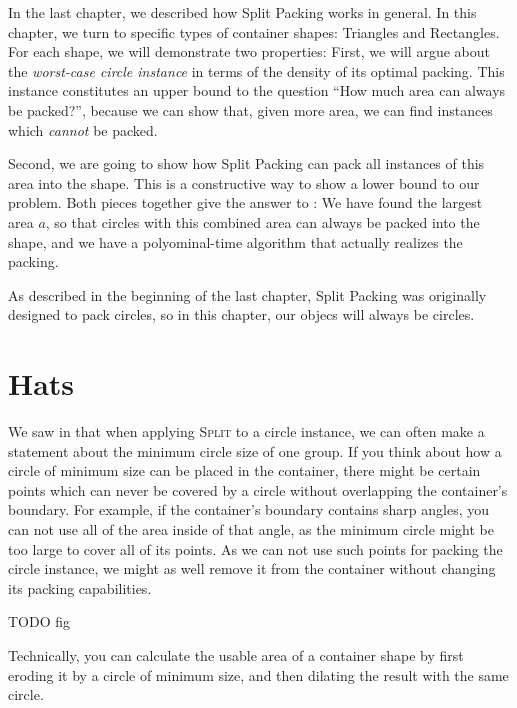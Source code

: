\documentclass[a4paper,style=print,oneside,bibliography=totoc,nexus,lnum,extramargin]{tubsbook}
\begin{document}
In the last chapter, we described how Split Packing works in general. In this chapter, we turn to specific types of container shapes: Triangles and Rectangles. For each shape, we will demonstrate two properties: First, we will argue about the \emph{worst-case circle instance} in terms of the density of its optimal packing. This instance constitutes an upper bound to the question “How much area can always be packed?”, because we can show that, given more area, we can find instances which \emph{cannot} be packed.

Second, we are going to show how Split Packing can pack all instances of this area into the shape. This is a constructive way to show a lower bound to our problem. Both pieces together give the answer to : We have found the largest area $a$, so that circles with this combined area can always be packed into the shape, and we have a polyominal-time algorithm that actually realizes the packing.

As described in the beginning of the last chapter, Split Packing was originally designed to pack circles, so in this chapter, our objecs will always be circles.


\section{Hats}

We saw in  that when applying \textsc{Split} to a circle instance, we can often make a statement about the minimum circle size of one group.
If you think about how a circle of minimum size can be placed in the container, there might be certain points which can never be covered by a circle without overlapping the container's boundary. For example, if the container's boundary contains sharp angles, you can not use all of the area inside of that angle, as the minimum circle might be too large to cover all of its points. As we can not use such points for packing the circle instance, we might as well remove it from the container without changing its packing capabilities.

TODO fig

Technically, you can calculate the usable area of a container shape by first eroding it by a circle of minimum size, and then dilating the result with the same circle.
\end{document}
